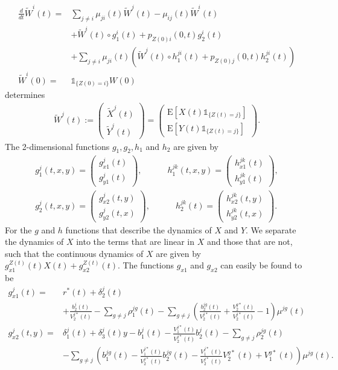 \documentclass[12pt]{article}
\newcommand{\E}{\text{E}}
\newcommand{\indic}[1]{\mathds{1}_{ \{ #1 \} }}
\theoremstyle{my_thm}
\begin{document}
\begin{align*}
\frac{d}{dt}\tilde{W}^i(t)=&
\sum_{j \neq i} \mu_{ji}(t) \tilde{W}^j(t)-\mu_{ij}(t)\tilde{W}^i(t)
 \\
&+
\tilde{W}^i(t) \circ g_1^i(t)+p_{Z(0)i}(0,t)g_2^i(t)
\\
&+
\sum_{j\neq i} \mu_{ji}(t) \left( \tilde{W}^j(t) \circ  h_1^{ji}(t)+ p_{Z(0)j}(0,t)h_2^{ji}(t)\right) 
\\
\tilde{W}^i(0)=&\indic{Z(0)=i}W(0) 
\end{align*}
determines
\begin{align*}
\tilde{W}^j(t):=
\begin{pmatrix}
\tilde{X}^j(t) \\
\tilde{Y}^j(t)
\end{pmatrix}
=
\begin{pmatrix}
\E[ X(t) \indic{Z(t)=j}] \\
\E[ Y(t) \indic{Z(t)=j}]
\end{pmatrix}.
\end{align*}
The 2-dimensional functions $g_1,g_2,h_1$ and $h_2$ are given by
\begin{gather*}
g^j_1(t,x,y)=\begin{pmatrix}
g^j_{x1}(t) \\
g^j_{y1}(t)
\end{pmatrix},
\qquad 
\quad
h^{jk}_1(t,x,y)=\begin{pmatrix}
h^{jk}_{x1}(t) \\
h^{jk}_{y1}(t)
\end{pmatrix},
\\
g_2^j(t,x,y)=\begin{pmatrix}
g^j_{x2}(t,y) \\
g^j_{y2}(t,x)
\end{pmatrix},
\qquad 
\quad
h^{jk}_2(t)=\begin{pmatrix}
h^{jk}_{x2}(t,y) \\
h^{jk}_{y2}(t,x)
\end{pmatrix}.
\end{gather*}
For the $g$ and $h$ functions that describe the dynamics of $X$ and $Y$. We separate the dynamics of $X$ into the terms that are linear in $X$ and those that are not, such that the continuous dynamics of $X$ are given by $g_{x1}^{Z(t)}(t)X(t)+g_{x2}^{Z(t)}(t)$. The functions $g_{x1}$ and $g_{x2}$ can easily be found to be
\begin{align*}
g^j_{x1}(t)=&r^*(t)  +\delta_2^j(t)\\
&+\frac{b^j_2(t)}{V_2^{j*}(t)}
-\sum_{g \neq j} \rho_1^{jg}(t)
-\sum_{g \neq j} \left(\frac{b^{jg}_2(t)}{V_2^{j*}(t)} + \frac{V^{g*}_2(t)}{V^{j*}_2(t)}-1 \right) \mu^{jg}(t)
\\
g^j_{x2}(t,y)=& \delta_1^j(t)
+\delta_3^j(t)y
-b_1^j(t)
-\frac{V_1^{j*}(t)}{V_2^{j*}(t)}b^j_2(t)
-\sum_{g \neq j} \rho_2^{jg}(t)
\\
&-\sum_{g \neq j} \left( b_1^{jg}(t)-\frac{V_1^{j*}(t)}{V_2^{j*}(t)}b^{jg}_2(t) -\frac{V^{j*}_1(t)}{V^{j*}_2(t)}V^{g*}_2(t)+V^{g*}_1(t) \right) \mu^{jg}(t).
\end{align*}
\end{document}
